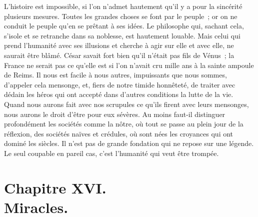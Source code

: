 \documentclass[french,twoside]{book} %
\newcommand\chapteropen{} %
\newcommand\chapterclose{} %
\begin{document}
L’histoire est impossible, si l’on n’admet hautement qu’il y a pour la sincérité plusieurs mesures. Toutes les grandes choses se font par le peuple ; or on ne conduit le peuple qu’en se prêtant à ses idées. Le philosophe qui, sachant cela, s’isole et se retranche dans sa noblesse, est hautement louable. Mais celui qui prend l’humanité avec ses illusions et cherche à agir sur elle et avec elle, ne saurait être blâmé. César savait fort bien qu’il n’était pas fils de Vénus ; la France ne serait pas ce qu’elle est si l’on n’avait cru mille ans à la sainte ampoule de Reims. Il nous est facile à nous autres, impuissants que nous sommes, d’appeler cela mensonge, et, fiers de notre timide honnêteté, de traiter avec dédain les héros qui ont accepté dans d’autres conditions la lutte de la vie. Quand nous aurons fait avec nos scrupules ce qu’ils firent avec leurs mensonges, nous aurons le droit d’être pour eux sévères. Au moins faut-il distinguer profondément les sociétés comme la nôtre, où tout se passe au plein jour de la réflexion, des sociétés naïves et crédules, où sont nées les croyances qui ont dominé les siècles. Il n’est pas de grande fondation qui ne repose sur une légende. Le seul coupable en pareil cas, c’est l’humanité qui veut être trompée.
\chapterclose


\chapteropen
\chapter[{Chapitre XVI. Miracles.}]{Chapitre XVI.\\
Miracles.}\renewcommand{\leftmark}{Chapitre XVI.\\
Miracles.}
\end{document}
